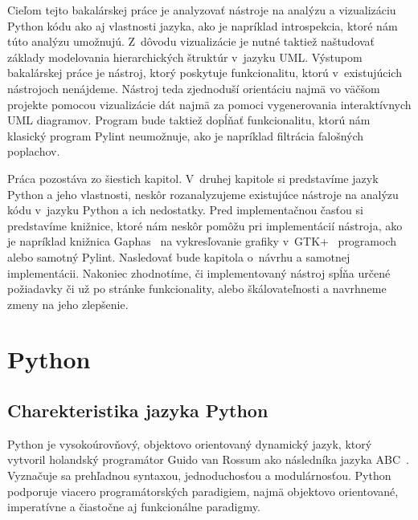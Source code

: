 \documentclass[11pt,oneside,final]{fithesis2}
\begin{document}
	Cieľom tejto bakalárskej práce je analyzovať nástroje na analýzu a vizualizáciu Python kódu ako aj vlastnosti jazyka, ako je napríklad introspekcia, ktoré nám túto analýzu umožnujú. Z~dôvodu vizualizácie je nutné taktiež naštudovať základy modelovania hierarchických štruktúr v~jazyku UML. Výstupom bakalárskej práce je nástroj, ktorý poskytuje funkcionalitu, ktorú v~existujúcich nástrojoch nenájdeme. Nástroj teda zjednoduší orientáciu najmä vo väčšom projekte pomocou vizualizácie dát najmä za pomoci vygenerovania interaktívnych UML diagramov. Program bude taktiež dopĺňať funkcionalitu, ktorú nám klasický program Pylint neumožnuje, ako je napríklad filtrácia falošných poplachov. 

	Práca pozostáva zo šiestich kapitol. V~druhej kapitole si predstavíme jazyk Python a jeho vlastnosti, neskôr rozanalyzujeme existujúce nástroje na analýzu kódu v~jazyku Python a ich nedostatky. Pred implementačnou časťou si predstavíme knižnice, ktoré nám neskôr pomôžu pri implementácií nástroja, ako je napríklad knižnica Gaphas~\cite{gaphas} na vykresľovanie grafiky v~GTK+~\cite{gtkplus} programoch alebo samotný Pylint. Nasledovať bude kapitola o~návrhu a samotnej implementácii. Nakoniec zhodnotíme, či implementovaný nástroj spĺňa určené požiadavky či už po stránke funkcionality, alebo škálovateľnosti a navrhneme zmeny na jeho zlepšenie.
 


%
%
%

\chapter{Python}

	\section{Charekteristika jazyka Python}
	Python je vysokoúrovňový, objektovo orientovaný dynamický jazyk, ktorý vytvoril holandský programátor Guido van Rossum ako následníka jazyka ABC~\cite{abc}.
Vyznačuje sa prehľadnou syntaxou, jednoduchosťou a modulárnosťou. Python podporuje viacero programátorských paradigiem, najmä objektovo orientované, imperatívne a čiastočne aj funkcionálne paradigmy.
\end{document}
